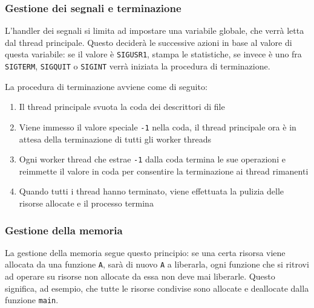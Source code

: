\documentclass[11pt]{article} %
\begin{document}
\subsubsection{Gestione dei segnali e terminazione}
L'handler dei segnali si limita ad impostare una variabile globale, che verrà letta dal thread principale. Questo deciderà le successive azioni in base al valore di questa variabile: se il valore è \texttt{SIGUSR1}, stampa le statistiche, se invece è uno fra \texttt{SIGTERM}, \texttt{SIGQUIT} o \texttt{SIGINT} verrà iniziata la procedura di terminazione.

La procedura di terminazione avviene come di seguito:
\begin{enumerate}
\item Il thread principale svuota la coda dei descrittori di file
\item Viene immesso il valore speciale \texttt{-1} nella coda, il thread principale ora è in attesa della terminazione di tutti gli worker threads
\item Ogni worker thread che estrae \texttt{-1} dalla coda termina le sue operazioni e reimmette il valore in coda per consentire la terminazione ai thread rimanenti
\item Quando tutti i thread hanno terminato, viene effettuata la pulizia delle risorse allocate e il processo termina
\end{enumerate}

\subsubsection{Gestione della memoria}
La gestione della memoria segue questo principio: se una certa risorsa viene allocata da una funzione \texttt{A}, sarà di nuovo \texttt{A} a liberarla, ogni funzione che si ritrovi ad operare su risorse non allocate da essa non deve mai liberarle. Questo significa, ad esempio, che tutte le risorse condivise sono allocate e deallocate dalla funzione \texttt{main}.
\end{document}
